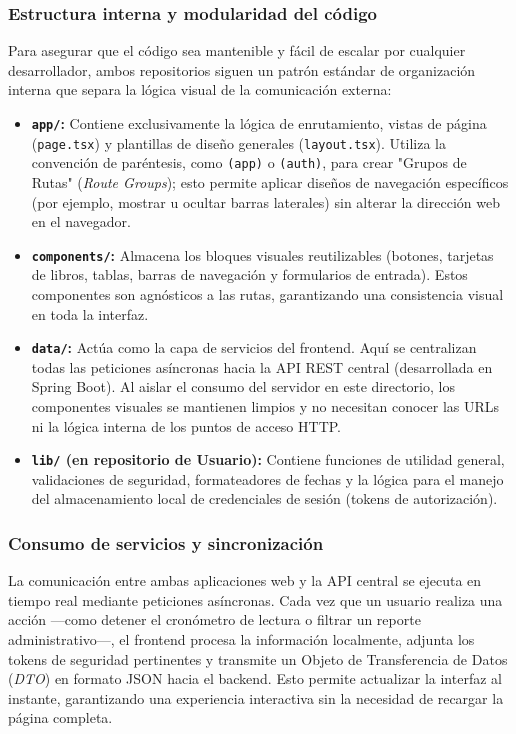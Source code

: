 \documentclass[12pt, atypical, journal]{article}
\begin{document}
\subsubsection{Estructura interna y modularidad del código}
Para asegurar que el código sea mantenible y fácil de escalar por cualquier desarrollador, ambos repositorios siguen un patrón estándar de organización interna que separa la lógica visual de la comunicación externa:

\begin{itemize}
    \item \textbf{\texttt{app/}:} Contiene exclusivamente la lógica de enrutamiento, vistas de página (\texttt{page.tsx}) y plantillas de diseño generales (\texttt{layout.tsx}). Utiliza la convención de paréntesis, como \texttt{(app)} o \texttt{(auth)}, para crear "Grupos de Rutas" (\textit{Route Groups}); esto permite aplicar diseños de navegación específicos (por ejemplo, mostrar u ocultar barras laterales) sin alterar la dirección web en el navegador.
    
    \item \textbf{\texttt{components/}:} Almacena los bloques visuales reutilizables (botones, tarjetas de libros, tablas, barras de navegación y formularios de entrada). Estos componentes son agnósticos a las rutas, garantizando una consistencia visual en toda la interfaz.
    
    \item \textbf{\texttt{data/}:} Actúa como la capa de servicios del frontend. Aquí se centralizan todas las peticiones asíncronas hacia la API REST central (desarrollada en Spring Boot). Al aislar el consumo del servidor en este directorio, los componentes visuales se mantienen limpios y no necesitan conocer las URLs ni la lógica interna de los puntos de acceso HTTP.
    
    \item \textbf{\texttt{lib/} (en repositorio de Usuario):} Contiene funciones de utilidad general, validaciones de seguridad, formateadores de fechas y la lógica para el manejo del almacenamiento local de credenciales de sesión (tokens de autorización).
\end{itemize}

\subsubsection{Consumo de servicios y sincronización}
La comunicación entre ambas aplicaciones web y la API central se ejecuta en tiempo real mediante peticiones asíncronas. Cada vez que un usuario realiza una acción —como detener el cronómetro de lectura o filtrar un reporte administrativo—, el frontend procesa la información localmente, adjunta los tokens de seguridad pertinentes y transmite un Objeto de Transferencia de Datos (\textit{DTO}) en formato JSON hacia el backend. Esto permite actualizar la interfaz al instante, garantizando una experiencia interactiva sin la necesidad de recargar la página completa.
\end{document}
